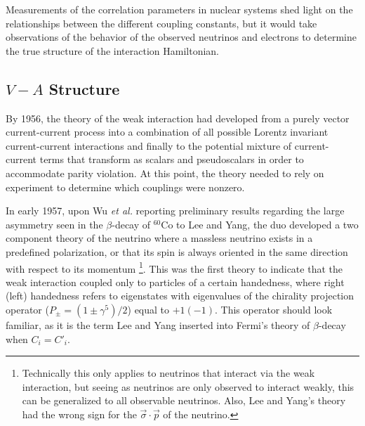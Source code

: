 Measurements of the correlation parameters in nuclear systems shed light on the
relationships between the different coupling constants, but it would take observations
of the behavior of the observed neutrinos and electrons to determine the true structure
of the interaction Hamiltonian.

\subsection{$V-A$ Structure} \label{ssec:VminusA}

By 1956, the theory of the weak interaction had developed from a purely vector current-current
process into
a combination of all possible Lorentz invariant current-current interactions and finally to the potential mixture
of current-current terms that transform as scalars and pseudoscalars in order to accommodate
parity violation. At this point, the theory needed to rely on experiment to determine
which couplings were nonzero.

In early 1957, upon Wu \textit{et al.} reporting preliminary results regarding the large asymmetry seen in the $\beta$-decay
of $^{60}\mathrm{Co}$ to Lee and Yang, the duo developed a two component theory
of the neutrino where a massless neutrino exists in a predefined polarization, or that
its spin is always oriented in the same direction with respect to its momentum \cite{lee1957}
\footnote{Technically this only applies to neutrinos that interact via
  the weak interaction, but seeing as neutrinos are only
  observed to interact weakly, this can be generalized to all observable neutrinos. Also, Lee and
  Yang's theory had the wrong sign for the $\vec{\sigma} \cdot \vec{p}$ of the neutrino.}.
This was the first theory to indicate that the weak interaction coupled only to particles
of a certain handedness, where right (left) handedness refers to eigenstates with eigenvalues of the
chirality projection operator ($P_{\pm} = (1\pm \gamma^5)/2$) equal to $+1\mathrm{ }(-1)$. This operator
should look familiar, as it is the term Lee and Yang inserted into Fermi's theory of $\beta$-decay
when $C_i=C'_i$. 

